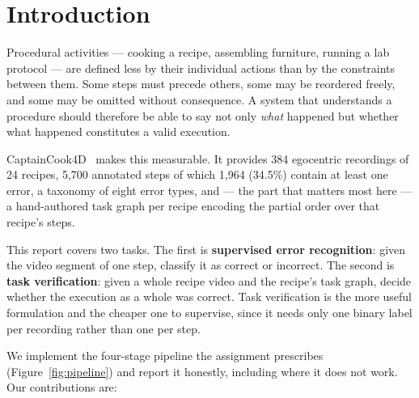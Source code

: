 \documentclass[10pt,twocolumn,letterpaper]{article}
\begin{document}
\section{Introduction}

Procedural activities --- cooking a recipe, assembling furniture, running a lab
protocol --- are defined less by their individual actions than by the constraints
between them. Some steps must precede others, some may be reordered freely, and
some may be omitted without consequence. A system that understands a procedure
should therefore be able to say not only \emph{what} happened but whether what
happened constitutes a valid execution.

CaptainCook4D~\cite{peddi2024captaincook4d} makes this measurable. It provides 384
egocentric recordings of 24 recipes, 5{,}700 annotated steps of which 1{,}964
(34.5\%) contain at least one error, a taxonomy of eight error types, and --- the
part that matters most here --- a hand-authored task graph per recipe encoding the
partial order over that recipe's steps.

This report covers two tasks. The first is \textbf{supervised error recognition}:
given the video segment of one step, classify it as correct or incorrect. The
second is \textbf{task verification}: given a whole recipe video and the recipe's
task graph, decide whether the execution as a whole was correct. Task verification
is the more useful formulation and the cheaper one to supervise, since it needs
only one binary label per recording rather than one per step.

We implement the four-stage pipeline the assignment prescribes
(Figure~\ref{fig:pipeline}) and report it honestly, including where it does not
work. Our contributions are:
\end{document}
